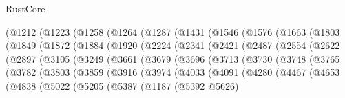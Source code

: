 \begin{lexlean}{RustCore}
\begin{coremodule}
{\begin{coremodule}
{{{{{{{{{{{{{{{{{{{{{{{{{{{{{{{{{{{{{{{{{{{{    (@1212
      (@1223
        (@1258
          (@1264
            (@1287
              (@1431
                (@1546
                  (@1576
                    (@1663
                      (@1803
                        (@1849
                          (@1872
                            (@1884
                              (@1920
                                (@2224
                                  (@2341
                                    (@2421
                                      (@2487
                                        (@2554
                                          (@2622
                                            (@2897
                                              (@3105
                                                (@3249
                                                  (@3661
                                                    (@3679
                                                      (@3696
                                                        (@3713
                                                          (@3730
                                                            (@3748
                                                              (@3765
                                                                (@3782
                                                                  (@3803
                                                                    (@3859
                                                                      (@3916
                                                                        (@3974
                                                                          (@4033
                                                                            (@4091
                                                                              (@4280
                                                                                (@4467
                                                                                  (@4653
                                                                                    (@4838
                                                                                      (@5022
                                                                                        (@5205
                                                                                          (@5387
                                                                                            (@1187
                                                                                              (@5392
                                                                                                @5626)
}}}}}}}}}}}}}}}}}}}}}}}}}}}}}}}}}}}}}}}}}}}}
\end{coremodule}}
\end{coremodule}
\end{lexlean}
